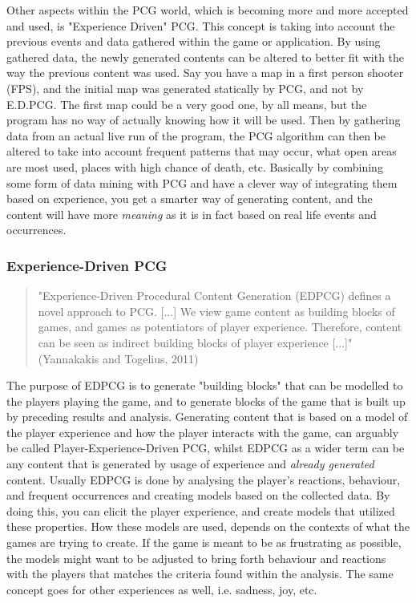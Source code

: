 Other aspects within the PCG world, which is becoming more and more accepted and used, is "Experience Driven" PCG\cite{art:exppcg}. This concept is taking into account the previous events and data gathered within the game or application. By using gathered data, the newly generated contents can be altered to better fit with the way the previous content was used. Say you have a map in a first person shooter (FPS), and the initial map was generated statically by PCG, and not by E.D.PCG. The first map could be a very good one, by all means, but the program has no way of actually knowing how it will be used. Then by gathering data from an actual live run of the program, the PCG algorithm can then be altered to take into account frequent patterns that may occur, what open areas are most used, places with high chance of death, etc. Basically by combining some form of data mining with PCG and have a clever way of integrating them based on experience, you get a smarter way of generating content, and the content will have more \textit{meaning} as it is in fact based on real life events and occurrences.

\subsubsection{Experience-Driven PCG}
\begin{quotation} 
"Experience-Driven Procedural Content Generation (EDPCG) defines a novel approach to PCG. [...] We view game content as building blocks of games, and games as potentiators of player experience. Therefore, content can be seen as indirect building blocks of player experience [...]" (Yannakakis and Togelius, 2011) \cite{art:edpcg}
\end{quotation}

The purpose of EDPCG is to generate "building blocks" that can be modelled to the players playing the game, and to generate blocks of the game that is built up by preceding results and analysis. Generating content that is based on a model of the player experience and how the player interacts with the game, can arguably be called Player-Experience-Driven PCG, whilst EDPCG as a wider term can be any content that is generated by usage of experience and \textit{already generated} content. Usually EDPCG is done by analysing the player's reactions, behaviour, and frequent occurrences and creating models based on the collected data. By doing this, you can elicit the player experience, and create models that utilized these properties. How these models are used, depends on the contexts of what the games are trying to create. If the game is meant to be as frustrating as possible, the models might want to be adjusted to bring forth behaviour and reactions with the players that matches the criteria found within the analysis. The same concept goes for other experiences as well, i.e. sadness, joy, etc.

